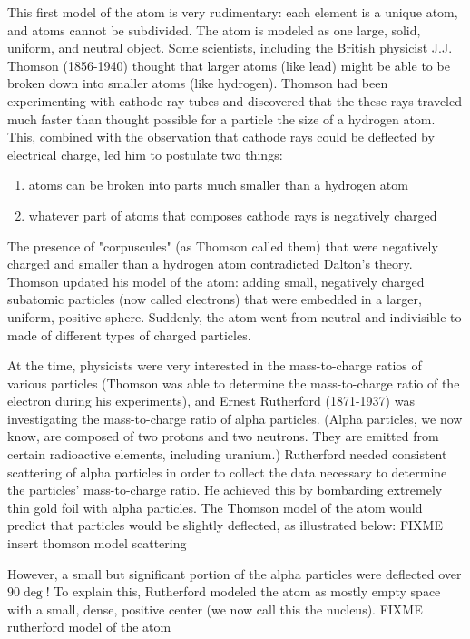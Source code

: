 This first model of the atom is very rudimentary: each element is a unique atom, 
and atoms cannot be subdivided. The atom is modeled as one large, solid, uniform, 
and neutral object. Some scientists, including the British physicist J.J. Thomson 
(1856-1940) thought that larger atoms (like lead) might be able to be broken down
into smaller atoms (like hydrogen). Thomson had been experimenting with cathode 
ray tubes and discovered that the these rays traveled much faster than thought 
possible for a particle the size of a hydrogen atom. This, combined with the 
observation that cathode rays could be deflected by electrical charge, led him to 
postulate two things:

\begin{enumerate}
\item atoms can be broken into parts much smaller than a hydrogen atom
\item whatever part of atoms that composes cathode rays is negatively charged
\end{enumerate}

The presence of "corpuscules" (as Thomson called them) that were negatively 
charged and smaller than a hydrogen atom contradicted Dalton's theory. Thomson 
updated his model of the atom: adding small, negatively charged subatomic 
particles (now called electrons) that were embedded in a larger, uniform, positive 
sphere. Suddenly, the atom went from neutral and indivisible to made of different 
types of charged particles. 

At the time, physicists were very interested in the mass-to-charge ratios of 
various particles (Thomson was able to determine the mass-to-charge ratio of the 
electron during his experiments), and Ernest Rutherford (1871-1937) was 
investigating the mass-to-charge ratio of alpha particles. (Alpha particles, we 
now know, are composed of two protons and two neutrons. They are emitted from 
certain radioactive elements, including uranium.) Rutherford needed consistent 
scattering of alpha particles in order to collect the data necessary to determine 
the particles' mass-to-charge ratio. He achieved this by bombarding extremely 
thin gold foil with alpha particles. The Thomson model of the atom would predict 
that particles would be slightly deflected, as illustrated below: 
FIXME insert thomson model scattering


However, a small but significant portion of the alpha particles were deflected 
over $90 \deg$! To explain this, Rutherford modeled the atom as mostly empty 
space with a small, dense, positive center (we now call this the nucleus).
FIXME rutherford model of the atom

